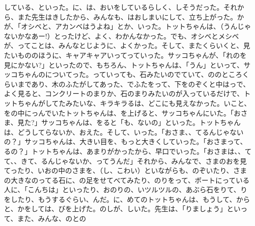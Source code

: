 している、といった。に、は、おいをしているらしく、しそうだった。それから、また先生はきしたから、みんなも、はおしまいにして、立ち上がった。かが、「オシベと、アカンベはうよね」とか、いった。トットちゃんは、（うんじゃないかなあー!）とったけど、よく、わかんなかった。でも、オシベとメシベが、ってことは、みんなとじように、よくかった。そして、またくらいくと、見たいもののほうに、キャアキャアいってっていった。サッコちゃんが、「れのを見にかない?」といったので、もちろん、トットちゃんは、「うん」といって、サッコちゃんのについてった。っていっても、石みたいのでていて、ののところくらいまであり、木のふたがしてあった、でふたをって、下をのぞくと中はっで、よく見ると、コンクリートのまりか、石のまりみたいのが入っているだけで、トットちゃんがしてたみたいな、キラキラるは、どこにも見えなかった。いこと、をの中にっんでいたトットちゃんは、を上げると、サッコちゃんにいた。「おさま、見た?」サッコちゃんは、をると「も、ないの」といった。トットちゃんは、どうしてらないか、おえた。そして、いった。「おさま、、てるんじゃないの？」サッコちゃんは、大きい目を、もっと大きくしていった。「おさまって、るの？」トットちゃんは、あまりがかったから、早口でいった。「おさまは、、てて、、きて、るんじゃないか、ってうんだ」それから、みんなで、さまのおを見てったり、いおの中のさまを、（し、こわい）といながらも、のぞいたり、さまの大きなのってる石に、の足をせてべてみたり、のりをって、ボートにっている人に、「こんちは」といったり、おのりの、いツルツルの、あぶら石をりて、りをしたり、もうするぐらい、んだ。に、めてのトットちゃんは、もうして、からと、かをしては、びを上げた。のしが、しいた。先生は、「りましょう」といって、また、みんな、のとの